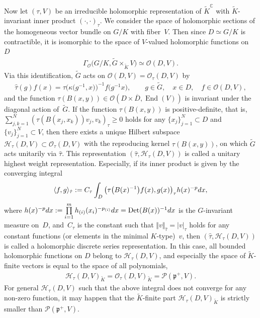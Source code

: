 \documentclass[11pt]{article}
\numberwithin{equation}{section}
\newcommand{\BC}{\mathbb{C}}
\newcommand{\fp}{\mathfrak{p}}
\newcommand{\cH}{\mathcal{H}}
\newcommand{\cO}{\mathcal{O}}
\newcommand{\cP}{\mathcal{P}}
\newcommand{\End}{\operatorname{End}}
\newcommand{\Det}{\operatorname{Det}}
\begin{document}
Now let $(\tau,V)$ be an irreducible holomorphic representation of $\tilde{K}^\BC$ with $\tilde{K}$-invariant inner product $(\cdot,\cdot)_\tau$.
We consider the space of holomorphic sections of the homogeneous vector bundle on $G/K$ with fiber~$V$. Then since $D\simeq G/K$ is contractible, it is isomorphic to the space of $V$-valued holomorphic functions on~$D$
\begin{gather*} \Gamma_\cO\big(G/K, \tilde{G}\times_{\tilde{K}}V\big)\simeq \cO(D,V). \end{gather*}
Via this identification, $\tilde{G}$ acts on $\cO(D,V)=\cO_\tau(D,V)$ by
\begin{gather*} \hat{\tau}(g)f(x)=\tau\big(\kappa\big(g^{-1},x\big)\big)^{-1}f\big(g^{-1}x\big),\qquad g\in\tilde{G}, \quad x\in D, \quad f\in\cO(D,V) , \end{gather*}
and the function $\tau(B(x,y))\in \cO(D\times\overline{D},\End(V))$ is invariant under the diagonal action of~$\tilde{G}$.
If the function $\tau(B(x,y))$ is positive-definite, that is,
$\sum\limits_{j,k=1}^N(\tau(B(x_j,x_k))v_j,v_k)_\tau\ge 0$ holds for any $\{x_j\}_{j=1}^N\subset D$ and $\{v_j\}_{j=1}^N\subset V$,
then there exists a unique Hilbert subspace $\cH_\tau(D,V)\subset\cO_\tau(D,V)$ with the reproducing kernel $\tau(B(x,y))$,
on which $\tilde{G}$ acts unitarily via $\hat{\tau}$.
This representation $(\hat{\tau},\cH_\tau(D,V))$ is called a unitary highest weight representation.
Especially, if its inner product is given by the converging integral
\begin{gather*} \langle f,g\rangle_{\hat{\tau}}:=C_\tau\int_D \big(\tau\big(B(x)^{-1}\big)f(x),g(x)\big)_{\tau}h(x)^{-p}{\rm d}x, \end{gather*}
where $h(x)^{-p}{\rm d}x:=\prod\limits_{i=1}^m h_{(i)}(x_i)^{-p_{(i)}}{\rm d}x=\Det(B(x))^{-1}{\rm d}x$ is the $G$-invariant measure on~$D$,
and~$C_\tau$ is the constant such that $\Vert v\Vert_{\hat{\tau}}=|v|_\tau$ holds for any constant functions
(or elements in the minimal $K$-type)~$v$,
then $(\hat{\tau},\cH_\tau(D,V))$ is called a holomorphic discrete series representation.
In this case, all bounded holomorphic functions on $D$ belong to $\cH_\tau(D,V)$,
and especially the space of $\tilde{K}$-finite vectors is equal to the space of all polynomials,
\begin{gather*} \cH_\tau(D,V)_{\tilde{K}}=\cO_\tau(D,V)_{\tilde{K}}=\cP(\fp^+,V). \end{gather*}
For general $\cH_\tau(D,V)$ such that the above integral does not converge for any non-zero function,
it may happen that the $\tilde{K}$-finite part $\cH_\tau(D,V)_{\tilde{K}}$ is strictly smaller than $\cP(\fp^+,V)$.
\end{document}
